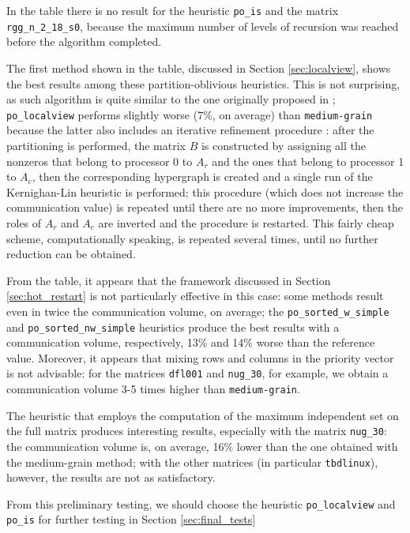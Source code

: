 In the table there is no result for the heuristic \verb|po_is| and the  matrix \verb|rgg_n_2_18_s0|, because the maximum number of levels of recursion was reached before the algorithm completed.


The first method shown in the table, discussed in Section \ref{sec:localview}, shows the best results among these partition-oblivious heuristics. This is not surprising, as such algorithm is quite similar to the one originally proposed in \cite{mediumgrain}; \verb|po_localview| performs slightly worse (7\%, on average) than \verb|medium-grain| because the latter also includes an iterative refinement procedure \cite[Section 3.3]{mediumgrain}: after the partitioning is performed, the matrix $B$ is constructed by assigning all the nonzeros that belong to processor 0 to $A_r$ and the ones that belong to processor 1 to $A_c$, then the corresponding hypergraph is created and a single run of the Kernighan-Lin heuristic is performed; this procedure (which does not increase the communication value) is repeated until there are no more improvements, then the roles of $A_r$ and $A_c$ are inverted and the procedure is restarted. This fairly cheap scheme, computationally speaking, is repeated several times, until no further reduction can be obtained. 

From the table, it appears that the framework discussed in Section \ref{sec:hot_restart} is not particularly effective in this case: some methods result even in twice the communication volume, on average; the \verb|po_sorted_w_simple| and \verb|po_sorted_nw_simple| heuristics produce the best results with a communication volume, respectively, 13\% and 14\% worse than the reference value. Moreover, it appears that mixing rows and columns in the priority vector is not advisable: for the matrices \verb|dfl001| and \verb|nug_30|, for example, we obtain a communication volume 3-5 times higher than \verb|medium-grain|. 

The heuristic that employs the computation of the maximum independent set on the full matrix produces interesting results, especially with the matrix \verb|nug_30|: the communication volume is, on average, 16\% lower than the one obtained with the medium-grain method; with the other matrices (in particular \verb|tbdlinux|), however, the results are not as satisfactory.

From this preliminary testing, we should choose the heuristic \verb|po_localview| and \verb|po_is| for further testing in Section \ref{sec:final_tests}

